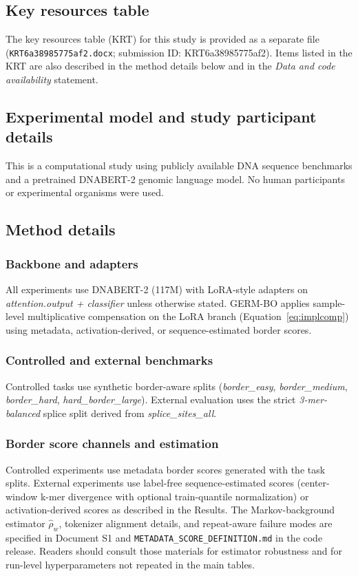 \documentclass[12pt,letterpaper]{article}
\newcommand{\splitname}[1]{\textit{#1}}
\newcommand{\modpath}[1]{\textit{#1}}
\begin{document}
\subsection*{Key resources table}
The key resources table (KRT) for this study is provided as a separate file (\texttt{KRT6a38985775af2.docx}; submission ID: KRT6a38985775af2). Items listed in the KRT are also described in the method details below and in the \emph{Data and code availability} statement.

\subsection*{Experimental model and study participant details}
This is a computational study using publicly available DNA sequence benchmarks and a pretrained DNABERT-2 genomic language model. No human participants or experimental organisms were used.

\subsection*{Method details}

\subsubsection*{Backbone and adapters}
All experiments use DNABERT-2 (117M) with LoRA-style adapters on \modpath{attention.output + classifier} unless otherwise stated. GERM-BO applies sample-level multiplicative compensation on the LoRA branch (Equation~\eqref{eq:implcomp}) using metadata, activation-derived, or sequence-estimated border scores.

\subsubsection*{Controlled and external benchmarks}
Controlled tasks use synthetic border-aware splits (\splitname{border\_easy}, \splitname{border\_medium}, \splitname{border\_hard}, \splitname{hard\_border\_large}). External evaluation uses the strict \splitname{3-mer-balanced} splice split derived from \splitname{splice\_sites\_all}.

\subsubsection*{Border score channels and estimation}
Controlled experiments use metadata border scores generated with the task splits. External experiments use label-free sequence-estimated scores (center-window k-mer divergence with optional train-quantile normalization) or activation-derived scores as described in the Results. The Markov-background estimator $\widehat{\rho}_w$, tokenizer alignment details, and repeat-aware failure modes are specified in Document S1 and \texttt{METADATA\_SCORE\_DEFINITION.md} in the code release. Readers should consult those materials for estimator robustness and for run-level hyperparameters not repeated in the main tables.
\end{document}
